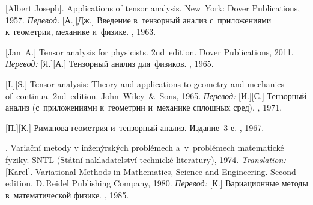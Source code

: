 \begin{thebibliography}{123}
\begin{otherlanguage}{russian}
%
%



[Albert Joseph]. Applications of tensor analysis. New~York: Dover Publications, 1957. 
\emph{Перевод:} [А.][Дж.] Введение в~тензорный анализ с~приложениями к~геометрии, механике и~физике. \fizmatgiz, 1963. 

[Jan~A.] Tensor analysis for physicists. 2nd~edition. Dover Publications, 2011. 
\emph{Перевод:} [Я.][А.] Тензорный анализ для~физиков. \naukapublisher, 1965. 

[I.][S.] Tensor analysis: Theory and applications to geometry and mechanics of~continua. 2nd~edition. John~Wiley~\&~Sons, 1965. 
\emph{Перевод:} [И.][С.] Тензорный анализ (с~приложениями к~геометрии и~механике сплошных сред). \naukapublisher, 1971. 

[П.][К.] Риманова геометрия и~тензорный анализ. Издание~3\hbox{-}е. \naukapublisher, 1967. 

%
%



. Varia\v{c}ní metody v in\v{z}en\'{y}rsk\'{y}ch probl\'{e}mech a~v~pro\-bl\'{e}\-mech matematick\'{e} fyziky. SNTL (St\'{a}tní nakladatelství technick\'{e} literatury), 1974. 
\emph{Translation:}
[Karel]. Variational Methods in Mathematics, Science and Engineering. Second edition. D.\,Reidel Publishing Company, 1980. 
\emph{Перевод:}
[К.] Вариационные методы в~математической физике. \mirpublisher, 1985. 


\end{otherlanguage}
\end{thebibliography}
